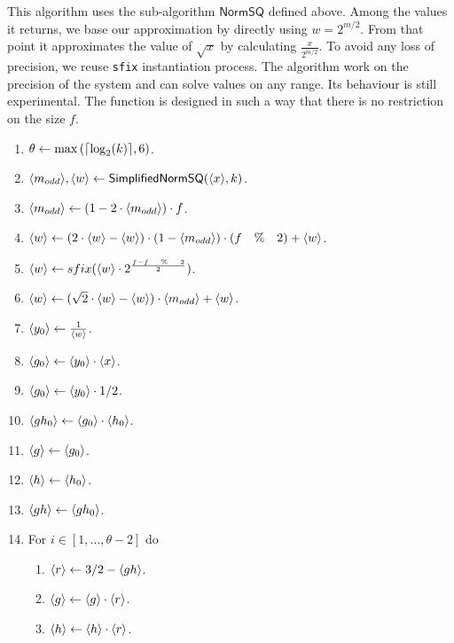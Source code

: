 This algorithm uses the sub-algorithm $\mathsf{NormSQ}$ defined above. Among the values it returns, we base our approximation by directly using $w =2^{m/2}$. From that point it approximates the  value of $\sqrt{x}$ by calculating $\frac{x}{2^{m/2}}$. To avoid any loss of precision, we reuse \verb|sfix| instantiation process.
The algorithm work on the precision of the system and can solve values on any range. Its behaviour is still experimental. The function is designed in such a way that there is no restriction on the size $f$.
\begin{enumerate}
  \item $\theta \leftarrow \max{({\lceil \log_2(k) \rceil},6)}$.
  \item $\langle m_{odd} \rangle, \langle w \rangle \leftarrow \mathsf{SimplifiedNormSQ}(\langle x \rangle,k)$.
  \item $\langle m_{odd} \rangle \leftarrow (1 - 2 \cdot \langle m_{odd} \rangle) \cdot f$.
  \item $\langle w \rangle \leftarrow (2 \cdot \langle w \rangle -\langle w \rangle) \cdot (1 - \langle m_{odd} \rangle) \cdot (f \quad \% \quad 2) + \langle w \rangle$.
  \item $\langle w \rangle \leftarrow sfix( \langle w \rangle \cdot 2 ^{\frac{f - f \quad \% \quad 2}{2}})$.
  \item $\langle w \rangle \leftarrow (\sqrt{2}\cdot \langle w \rangle - \langle w \rangle)\cdot \langle m_{odd} \rangle + \langle w \rangle$.
  \item $\langle y_0 \rangle \leftarrow \frac{1}{\langle w \rangle} $.
  \item $\langle g_0 \rangle \leftarrow \langle y_0 \rangle \cdot \langle x \rangle$.
  \item $\langle g_0 \rangle \leftarrow \langle y_0 \rangle \cdot 1/2$.
  \item $\langle gh_0 \rangle \leftarrow \langle g_0 \rangle \cdot \langle h_0 \rangle$.
  \item $\langle g \rangle \leftarrow \langle g_0 \rangle$.
  \item $\langle h \rangle \leftarrow \langle h_0 \rangle$.
  \item $\langle gh \rangle \leftarrow \langle gh_0 \rangle$.
  \item For $i \in[1,\ldots,\theta-2]$ do
        \begin{enumerate}
          \item $\langle r \rangle \leftarrow 3/2-\langle gh \rangle$.
          \item $\langle g \rangle \leftarrow \langle g \rangle \cdot \langle r \rangle$.
          \item $\langle h \rangle \leftarrow \langle h \rangle \cdot \langle r \rangle$.

\end{enumerate}
\end{enumerate}
